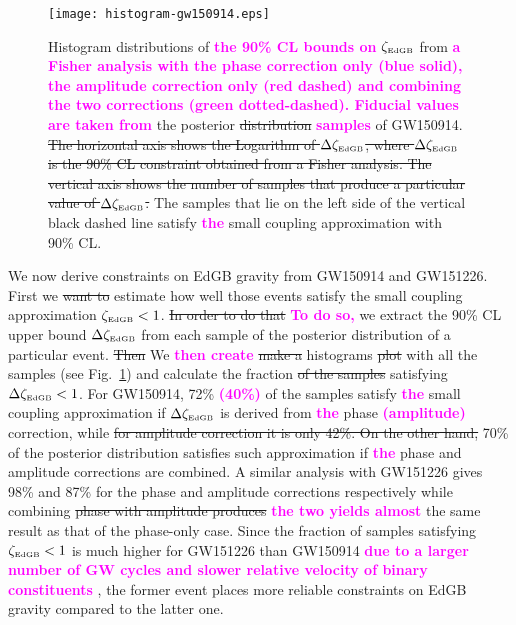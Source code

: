 \documentclass[prd,twocolumn,nofootinbib]{revtex4-1}
\newcommand{\EDGB}{{\mbox{\tiny EdGB}}}
\newcommand{\kent}[1]{\textcolor{magenta}{\textbf{#1}} }
\begin{document}
\begin{figure}[htb]
\texttt{[image: histogram-gw150914.eps]}
\caption{Histogram distributions of \kent{the 90\% CL bounds on} $\zeta_{\EDGB}$ from \kent{a Fisher analysis with the phase correction only (blue solid), the amplitude correction only (red dashed) and combining the two corrections (green dotted-dashed). Fiducial values are taken from} the posterior \sout{distribution} \kent{samples} of GW150914. \sout{The horizontal axis shows the Logarithm of $\Delta\zeta_{\EDGB}$,  where $\Delta\zeta_{\EDGB}$ is the 90\% CL constraint obtained from a Fisher analysis. The vertical axis shows the number of samples that produce a particular value of $\Delta\zeta_{\EDGB}$.} The samples that lie on the left side of the vertical black dashed line satisfy \kent{the} small coupling approximation with 90\% CL.}
\label{fig:histogram-edgb}
\end{figure}


We now derive constraints on EdGB gravity from GW150914 and GW151226. First we \sout{want to} estimate how well those events satisfy the small coupling approximation $\zeta_{\EDGB}<1$. \sout{In order to do that} \kent{To do so,} we extract the 90\% CL upper bound $\Delta\zeta_{\EDGB}$ from each sample of the posterior distribution of a particular event. \sout{Then} We \kent{then create} \sout{make a} histograms \sout{plot} with all the samples (see Fig.~\ref{fig:histogram-edgb}) and calculate the fraction \sout{of the samples} satisfying $\Delta\zeta_{\EDGB}<1$.  For GW150914, 72\% \kent{(40\%)} of the samples satisfy \kent{the} small coupling approximation if $\Delta\zeta_{\EDGB}$ is derived from \kent{the} phase \kent{(amplitude)} correction, while \sout{for amplitude correction it is only 42\%. On the other hand,} 70\% of the posterior distribution satisfies such approximation if \kent{the} phase and amplitude corrections are combined. A similar analysis with GW151226 gives 98\% and 87\% for the phase and amplitude corrections respectively while combining \sout{phase with amplitude produces} \kent{the two yields almost} the same result as that of the phase-only case. Since the fraction of samples satisfying $\zeta_{\EDGB}<1$ is much higher for GW151226 than GW150914 \kent{due to a larger number of GW cycles and slower relative velocity of binary constituents}, the former event places more reliable constraints on EdGB gravity compared to the latter one.
\end{document}

